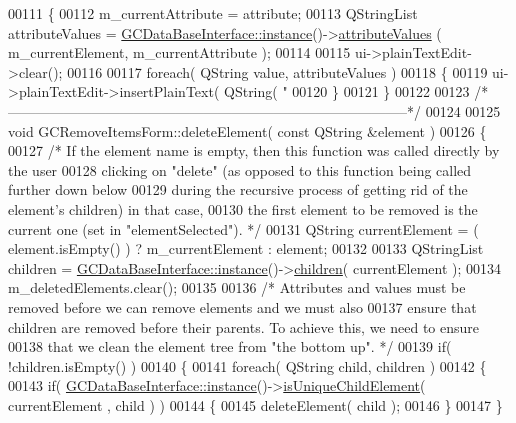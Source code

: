 \begin{DoxyCode}
00111 \{
00112   m\_currentAttribute = attribute;
00113   QStringList attributeValues = \hyperlink{class_g_c_data_base_interface_a1baea9c0667aa8b610ec30076fcab84c}{GCDataBaseInterface::instance}()->\hyperlink{class_g_c_data_base_interface_a329e17f6c02c62fd554884f2b5a7e2df}{attributeValues}
      ( m\_currentElement, m\_currentAttribute );
00114 
00115   ui->plainTextEdit->clear();
00116 
00117   \textcolor{keywordflow}{foreach}( QString value, attributeValues )
00118   \{
00119     ui->plainTextEdit->insertPlainText( QString( \textcolor{stringliteral}{"%
00120   \}
00121 \}
00122 
00123 \textcolor{comment}{/*
      --------------------------------------------------------------------------------------*/}
00124 
00125 \textcolor{keywordtype}{void} GCRemoveItemsForm::deleteElement( \textcolor{keyword}{const} QString &element )
00126 \{
00127   \textcolor{comment}{/* If the element name is empty, then this function was called directly by
       the user}
00128 \textcolor{comment}{    clicking on "delete" (as opposed to this function being called further down
       below}
00129 \textcolor{comment}{    during the recursive process of getting rid of the element's children) in
       that case,}
00130 \textcolor{comment}{    the first element to be removed is the current one (set in
       "elementSelected"). */}
00131   QString currentElement = ( element.isEmpty() ) ? m\_currentElement : element;
00132 
00133   QStringList children = \hyperlink{class_g_c_data_base_interface_a1baea9c0667aa8b610ec30076fcab84c}{GCDataBaseInterface::instance}()->\hyperlink{class_g_c_data_base_interface_aab5126783bc3acc7c718c8ffd8af62bc}{children}( 
      currentElement );
00134   m\_deletedElements.clear();
00135 
00136   \textcolor{comment}{/* Attributes and values must be removed before we can remove elements and we
       must also}
00137 \textcolor{comment}{    ensure that children are removed before their parents.  To achieve this, we
       need to ensure}
00138 \textcolor{comment}{    that we clean the element tree from "the bottom up". */}
00139   \textcolor{keywordflow}{if}( !children.isEmpty() )
00140   \{
00141     \textcolor{keywordflow}{foreach}( QString child, children )
00142     \{
00143       \textcolor{keywordflow}{if}( \hyperlink{class_g_c_data_base_interface_a1baea9c0667aa8b610ec30076fcab84c}{GCDataBaseInterface::instance}()->\hyperlink{class_g_c_data_base_interface_a94559ea23489e360757db42c50d3a261}{isUniqueChildElement}( currentElement
      , child ) )
00144       \{
00145         deleteElement( child );
00146       \}
00147     \}
}
\end{DoxyCode}
